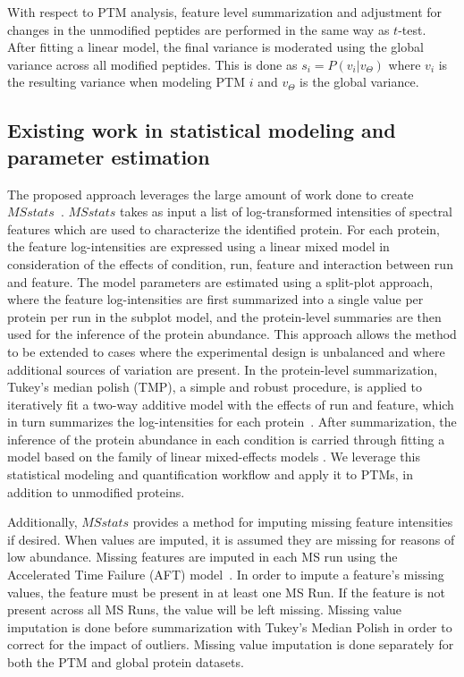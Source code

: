 \documentclass[mcp]{article}
\numberwithin{table}{section}
\begin{document}
With respect to PTM analysis, feature level summarization and adjustment for changes in the unmodified peptides are performed in the same way as $t$-test. After fitting a linear model, the final variance is moderated using the global variance across all modified peptides. This is done as $s_{i} = P(v_i| v_\Theta)$ where $v_i$ is the resulting variance when modeling PTM $i$ and $v_\Theta$ is the global variance.

\subsection*{Existing work in statistical modeling and parameter estimation}

The proposed approach leverages the large amount of work done to create $MSstats$~\cite{Choi:2014}. $MSstats$ takes as input a list of log-transformed intensities of spectral features which are used to characterize the identified protein. For each protein, the feature log-intensities are expressed using a linear mixed model in consideration of the effects of condition, run, feature and interaction between run and feature. The model parameters are estimated using a split-plot approach, where the feature log-intensities are first summarized into a single value per protein per run in the subplot model, and the protein-level summaries are then used for the inference of the protein abundance. This approach allows the method to be extended to cases where the experimental design is unbalanced and where additional sources of variation are present. In the protein-level summarization, Tukey's median polish (TMP), a simple and robust procedure, is applied to iteratively fit a two-way additive model with the effects of run and feature, which in turn summarizes the log-intensities for each protein~\cite{Tukey:1977}. After summarization, the inference of the protein abundance in each condition is carried through fitting a model based on the family of linear mixed-effects models \cite{Bolker2009} \cite{Faraway:2006}. We leverage this statistical modeling and quantification workflow and apply it to PTMs, in addition to unmodified proteins.

Additionally, $MSstats$ provides a method for imputing missing feature intensities if desired. When values are imputed, it is assumed they are missing for reasons of low abundance. Missing features are imputed in each MS run using the Accelerated Time Failure (AFT) model~\cite{Tukey:1977}. In order to impute a feature's missing values, the feature must be present in at least one MS Run. If the feature is not present across all MS Runs, the value will be left missing. Missing value imputation is done before summarization with Tukey's Median Polish in order to correct for the impact of outliers. Missing value imputation is done separately for both the PTM and global protein datasets.
\end{document}
